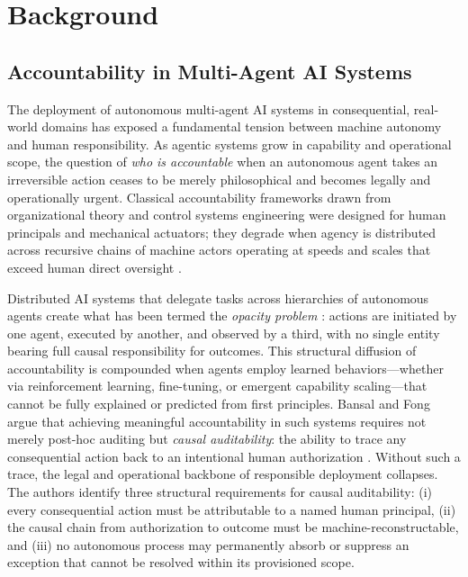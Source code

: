 \section{Background}

\subsection{Accountability in Multi-Agent AI Systems}

The deployment of autonomous multi-agent AI systems in consequential, real-world domains has exposed a fundamental tension between machine autonomy and human responsibility. As agentic systems grow in capability and operational scope, the question of \emph{who is accountable} when an autonomous agent takes an irreversible action ceases to be merely philosophical and becomes legally and operationally urgent. Classical accountability frameworks drawn from organizational theory and control systems engineering were designed for human principals and mechanical actuators; they degrade when agency is distributed across recursive chains of machine actors operating at speeds and scales that exceed human direct oversight \cite{wiener1948}.

Distributed AI systems that delegate tasks across hierarchies of autonomous agents create what has been termed the \emph{opacity problem} \cite{bansal2019}: actions are initiated by one agent, executed by another, and observed by a third, with no single entity bearing full causal responsibility for outcomes. This structural diffusion of accountability is compounded when agents employ learned behaviors—whether via reinforcement learning, fine-tuning, or emergent capability scaling—that cannot be fully explained or predicted from first principles. Bansal and Fong argue that achieving meaningful accountability in such systems requires not merely post-hoc auditing but \emph{causal auditability}: the ability to trace any consequential action back to an intentional human authorization \cite{bansal2019}. Without such a trace, the legal and operational backbone of responsible deployment collapses. The authors identify three structural requirements for causal auditability: (i) every consequential action must be attributable to a named human principal, (ii) the causal chain from authorization to outcome must be machine-reconstructable, and (iii) no autonomous process may permanently absorb or suppress an exception that cannot be resolved within its provisioned scope.

